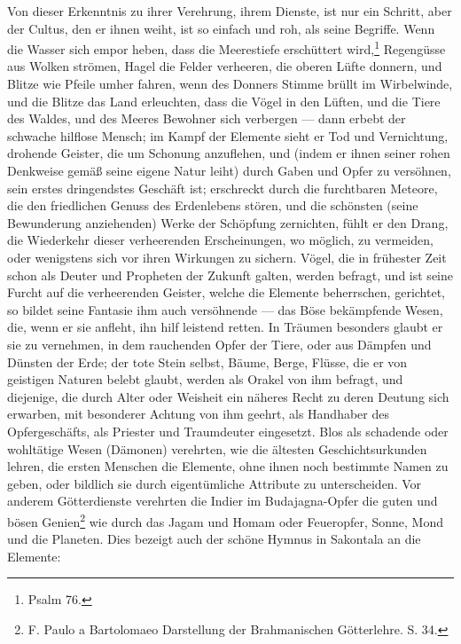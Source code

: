 \documentclass[a4paper, 11pt, oneside, polutonikogreek, german]{article}
\begin{document}
Von dieser Erkenntnis zu ihrer Verehrung, ihrem Dienste, ist nur ein Schritt, aber der Cultus, den er ihnen weiht, ist so einfach und roh, als seine Begriffe. Wenn die Wasser sich empor heben, dass die Meerestiefe erschüttert wird,\footnote{Psalm 76.} Regengüsse aus Wolken strömen, Hagel die Felder verheeren, die oberen Lüfte donnern, und Blitze wie Pfeile umher fahren, wenn des Donners Stimme brüllt im Wirbelwinde, und die Blitze das Land erleuchten, dass die Vögel in den Lüften, und die Tiere des Waldes, und des Meeres Bewohner sich verbergen --- dann erbebt der schwache hilflose Mensch; im Kampf der Elemente sieht er Tod und Vernichtung, drohende Geister, die um Schonung anzuflehen, und (indem er ihnen seiner rohen Denkweise gemäß seine eigene Natur leiht) durch Gaben und Opfer zu versöhnen, sein erstes dringendstes Geschäft ist; erschreckt durch die furchtbaren Meteore, die den friedlichen Genuss des Erdenlebens stören, und die schönsten (seine Bewunderung anziehenden) Werke der Schöpfung zernichten, fühlt er den Drang, die Wiederkehr dieser verheerenden Erscheinungen, wo möglich, zu vermeiden, oder wenigstens sich vor ihren Wirkungen zu sichern. Vögel, die in frühester Zeit schon als Deuter und Propheten der Zukunft galten, werden befragt, und ist seine Furcht auf die verheerenden Geister, welche die Elemente beherrschen, gerichtet, so bildet seine Fantasie ihm auch versöhnende --- das Böse bekämpfende Wesen, die, wenn er sie anfleht, ihn hilf leistend retten. In Träumen besonders glaubt er sie zu vernehmen, in dem rauchenden Opfer der Tiere, oder aus Dämpfen und Dünsten der Erde; der tote Stein selbst, Bäume, Berge, Flüsse, die er von geistigen Naturen belebt glaubt, werden als Orakel von ihm befragt, und diejenige, die durch Alter oder Weisheit ein näheres Recht zu deren Deutung sich erwarben, mit besonderer Achtung von ihm geehrt, als Handhaber des Opfergeschäfts, als Priester und Traumdeuter eingesetzt. Blos als schadende oder wohltätige Wesen (Dämonen) verehrten, wie die ältesten Geschichtsurkunden lehren, die ersten Menschen die Elemente, ohne ihnen noch bestimmte Namen zu geben, oder bildlich sie durch eigentümliche Attribute zu unterscheiden. Vor anderem Götterdienste verehrten die Indier im Budajagna-Opfer die guten und bösen Genien\footnote{F. Paulo a Bartolomaeo Darstellung der Brahmanischen Götterlehre. S. 34.} wie durch das Jagam und Homam oder Feueropfer, Sonne, Mond und die Planeten. Dies bezeigt auch der schöne Hymnus in Sakontala an die Elemente:
\vspace{9pt}
\\
\end{document}
